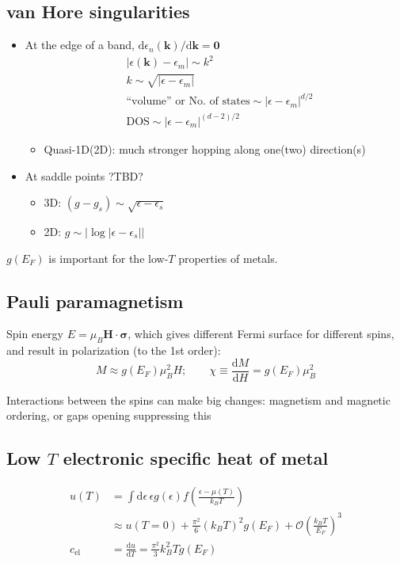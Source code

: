 \documentclass[11pt,letterpaper]{article}
\numberwithin{equation}{section} %
\renewcommand*{\vec}[1]{\bm{#1}}
\newcommand{\dif}{\mathrm d}
\begin{document}
\subsection{van Hore singularities}
\label{sub:van Hore singularities}
\begin{itemize}
  \item At the edge of a band, $\dif\epsilon_n(\vec k)/\dif\vec k = \vec 0$
	  \begin{align} &|\epsilon(\vec k) -\epsilon_m|\sim k^2 \\
					&k\sim\sqrt{|\epsilon-\epsilon_m|} \\ &\mbox{``volume''
		  or No. of states} \sim |\epsilon - \epsilon_m|^{d/2} \\
	  &\mbox{DOS}\sim |\epsilon - \epsilon_m|^{(d-2)/2} 
	  \end{align}
	  \begin{itemize}
		  \item Quasi-1D(2D): much stronger hopping along one(two)
			  direction(s)
	  \end{itemize}
  \item At saddle points ?TBD?
	  \begin{itemize}
		  \item 3D: $(g-g_s)\sim\sqrt{\epsilon - \epsilon_s}$
		  \item 2D: $g\sim|\log|\epsilon -\epsilon_s||$
	  \end{itemize}
\end{itemize}
$g(E_F)$ is important for the low-$T$ properties of metals.

\subsection{Pauli paramagnetism}
\label{sub:pauli_paramagnetism}
Spin energy $E = \mu_B \vec H\cdot\vec\sigma$, which gives different Fermi
surface for different spins, and result in polarization (to the 1st order): 
\begin{equation}
	M \approx g(E_F)\mu_B^2 H; \qquad 
	\chi \equiv \frac{\dif M}{\dif H} = g(E_F)\mu_B^2
\end{equation}

Interactions between the spins can make big changes: magnetism and magnetic
ordering, or gaps opening suppressing this

\subsection[Low T electronic specific heat of metal]{Low $T$ electronic specific heat of metal}
\label{sub:low_t_electronic_specific_heat_of_metal}
\begin{align}
	u(T) &= \int\dif\epsilon\, \epsilon g(\epsilon)f\left(
	\frac{\epsilon - \mu(T)}{k_B T}\right) \\
	&\approx u(T=0) + \frac{\pi^2}{6}(k_BT)^2g(E_F) + 
	\mathcal O\left(\frac{k_BT}{E_F}\right)^3 \\
	c_{\mbox{el}} &= \frac{\dif u}{\dif T} = \frac{\pi^2}{3} k_B^2 T g(E_F)
\end{align}
\end{document}
